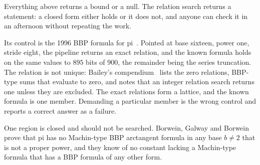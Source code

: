 Everything above returns a bound or a null. The relation search returns a statement: a closed form either holds or it does not, and anyone can check it in an afternoon without repeating the work.

Its control is the 1996 BBP formula for pi~\cite{src:Bailey-Borwein-and-Plouffe-1997}. Pointed at base sixteen, power one, stride eight, the pipeline returns an exact relation, and the known formula holds on the same values to \(895\) bits of \(900\), the remainder being the series truncation. The relation is not unique: Bailey's compendium~\cite{src:Bailey-2023} lists the zero relations, BBP-type sums that evaluate to zero, and notes that an integer relation search returns one unless they are excluded. The exact relations form a lattice, and the known formula is one member. Demanding a particular member is the wrong control and reports a correct answer as a failure.

One region is closed and should not be searched. Borwein, Galway and Borwein~\cite{src:Borwein} prove that pi has no Machin-type BBP arctangent formula in any base \(b \neq 2\) that is not a proper power, and they know of no constant lacking a Machin-type formula that has a BBP formula of any other form.

